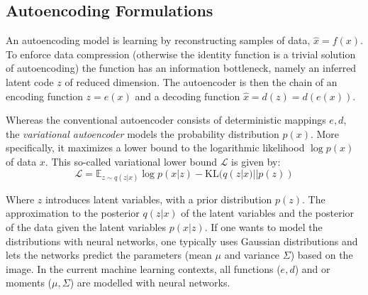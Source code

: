 	\subsection{Autoencoding Formulations}\label{sec:autoencoding}
		An autoencoding model is learning by reconstructing samples of data, $\hat x = f(x)$. To enforce data compression (otherwise the identity function is a trivial solution of autoencoding) the function has an information bottleneck, namely an inferred latent code $z$ of reduced dimension. The autoencoder is then the chain of an encoding function $z = e(x)$ and a decoding function $\hat x = d(z) = d(e(x))$.

		Whereas the conventional autoencoder consists of deterministic mappings $e, d$, the \textit{variational autoencoder} \cite{kingma13vae} models the probability distribution $p(x)$. More specifically, it maximizes a lower bound to the logarithmic likelihood $\log p(x)$ of data $x$. This so-called variational lower bound $\mathcal{L}$ is given by:
		\begin{equation}\label{eq:vae}
			\mathcal{L} = \mathds{E}_{z\sim q(z|x)}  \log p(x|z) - \textrm{KL}(q(z|x)||p(z))
		\end{equation}

		Where $z$ introduces latent variables, with a prior distribution $p(z)$. The approximation to the posterior $q(z|x)$ of the latent variables and the posterior of the data given the latent variables $p(x|z)$. If one wants to model the distributions with neural networks, one typically uses Gaussian distributions and lets the networks predict the parameters (mean $\mu$ and variance $\Sigma$) based on the image.
		In the current machine learning contexts, all functions ($e, d$) and or moments ($\mu, \Sigma$) are modelled with neural networks.

